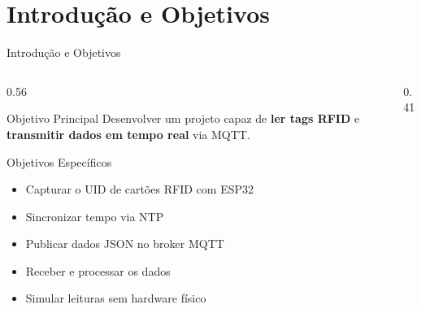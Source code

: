 \documentclass[aspectratio=169, 12pt]{beamer}
\begin{document}
\section{Introdu\c{c}\~{a}o e Objetivos}
\begin{frame}{Introdu\c{c}\~{a}o e Objetivos}
  \begin{columns}[T]
    \begin{column}{0.56\textwidth}
      \begin{block}{Objetivo Principal}
        Desenvolver um projeto capaz de \textbf{ler tags RFID}
        e \textbf{transmitir dados em tempo real} via MQTT.
      \end{block}
      \vspace{0.4em}
      \begin{block}{Objetivos Espec\'{i}ficos}
        \begin{itemize}
          \item Capturar o UID de cart\~{o}es RFID com ESP32
          \item Sincronizar tempo via NTP
          \item Publicar dados JSON no broker MQTT
          \item Receber e processar os dados
          \item Simular leituras sem hardware f\'{i}sico
        \end{itemize}
      \end{block}
    \end{column}
    \begin{column}{0.41\textwidth}
      \vspace{1cm}
      \hspace{0.5cm}
    \end{column}
  \end{columns}
\end{frame}
\end{document}

